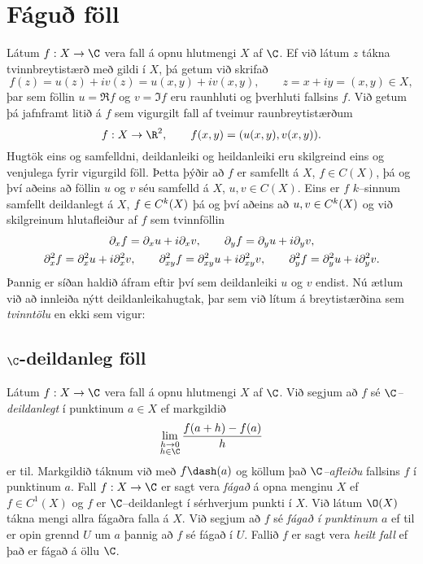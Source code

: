\section{Fáguð föll}


\noindent
Látum $f:X\to \C$ vera fall á opnu hlutmengi $X$ af $\C$.  
Ef við látum $z$ tákna tvinnbreytistærð með gildi í $X$, þá getum við
skrifað 
 \begin{equation*}f(z)=u(z)+iv(z)=u(x,y)+iv(x,y), \qquad z=x+iy=(x,y) \in X,
\label{4.2.1}
 \end{equation*}
þar sem föllin $u=\Re f$ og $v=\Im f$ eru raunhluti og þverhluti
fallsins $f$.
Við getum þá jafnframt litið á $f$ sem vigurgilt fall
af tveimur raunbreytistærðum
 \begin{equation*}f:X\to \R\sp 2, \qquad f(x,y)=(u(x,y), v(x,y)).
\label{4.2.2}
 \end{equation*}
Hugtök eins og samfelldni, deildanleiki og heildanleiki  eru
skilgreind eins og venjulega fyrir vigurgild föll.  Þetta þýðir að
$f$ er samfellt á $X$, $f\in C(X)$, þá og því aðeins að föllin $u$ og
$v$ séu samfelld á $X$, $u,v\in C(X)$.  Eins er $f$ $k$--sinnum
samfellt deildanlegt á $X$, $f\in C\sp k(X)$ þá og því aðeins að
$u,v\in C\sp k(X)$  og við skilgreinum hlutafleiður af $f$ sem tvinnföllin
\begin{gather*}
\partial_xf=\partial_xu+i\partial_xv, \qquad
\partial_yf=\partial_yu+i\partial_yv,\\
\partial\sp 2_xf=\partial\sp 2_xu+i\partial\sp 2_xv, \qquad
\partial\sp 2_{xy}f=\partial\sp 2_{xy}u+i\partial\sp 2_{xy}v,\qquad
\partial\sp 2_yf=\partial\sp 2_yu+i\partial\sp 2_yv.
\end{gather*}
Þannig er síðan haldið áfram eftir því sem deildanleiki $u$ og $v$
endist.  Nú ætlum við að innleiða nýtt deildanleikahugtak, þar sem
við lítum á breytistærðina sem {\it tvinntölu} en ekki sem vigur:

\subsection*{$\C$-deildanleg föll}

\begin{sk}
Látum $f:X\to \C$ vera fall á opnu hlutmengi $X$ af $\C$.  
Við segjum
að $f$ sé {\it $\C$--deildanlegt} í punktinum $a\in X$ ef markgildið
 \begin{equation*}\lim _{\substack{ h\to 0\\ h\in\C}}
 \dfrac{f(a+h)-f(a)}h  \label{4.2.3}
 \end{equation*}
er til.  Markgildið táknum við með $f\dash(a)$ og köllum það
{\it $\C$--afleiðu} fallsins $f$ í punktinum $a$.  
Fall $f:X\to \C$ er sagt vera {\it fágað} á opna menginu $X$ ef $f\in
C^1(X)$ og $f$ er $\C$--deildanlegt í sérhverjum punkti í $X$.  Við
látum $\O(X)$ tákna mengi allra fágaðra falla á $X$.  Við segjum að
$f$ sé {\it fágað í punktinum $a$} ef til er opin grennd $U$ um $a$ þannig
að $f$ sé fágað í $U$.  Fallið $f$ er sagt vera {\it heilt fall} ef
það er fágað á  öllu $\C$.
\end{sk}


